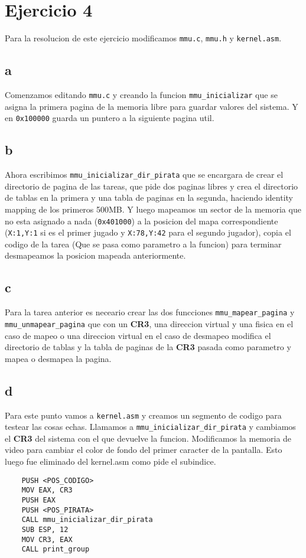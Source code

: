 \section{Ejercicio 4}

Para la resolucion de este ejercicio modificamos \texttt{mmu.c}, \texttt{mmu.h} y \texttt{kernel.asm}.

\subsection{a}
Comenzamos editando \texttt{mmu.c} y creando la funcion \texttt{mmu\_inicializar} que se asigna la primera pagina de la memoria libre para guardar valores del sistema. Y en \texttt{0x100000} guarda un puntero a la siguiente pagina util.

\subsection{b}
Ahora escribimos \texttt{mmu\_inicializar\_dir\_pirata} que se encargara de crear el directorio de pagina de las tareas, que pide dos paginas libres y crea el directorio de tablas en la primera y una tabla de paginas en la segunda, haciendo identity mapping de los primeros 500MB. Y luego mapeamos un sector de la memoria que no esta asignado a nada (\texttt{0x401000}) a la posicion del mapa correspondiente (\texttt{X:1,Y:1} si es el primer jugado y \texttt{X:78,Y:42} para el segundo jugador), copia el codigo de la tarea (Que se pasa como parametro a la funcion) para terminar desmapeamos la posicion mapeada anteriormente.

\subsection{c}
Para la tarea anterior es neceario crear las dos funcciones \texttt{mmu\_mapear\_pagina} y \texttt{mmu\_unmapear\_pagina} que con un \textbf{CR3}, una direccion virtual y una fisica en el caso de mapeo o una direccion virtual en el caso de desmapeo modifica el directorio de tablas y la tabla de paginas de la \textbf{CR3} pasada como parametro y mapea o desmapea la pagina.

\subsection{d}
Para este punto vamos a \texttt{kernel.asm} y creamos un segmento de codigo para testear las cosas echas. Llamamos a \texttt{mmu\_inicializar\_dir\_pirata} y cambiamos el \textbf{CR3} del sistema con el que devuelve la funcion. Modificamos la memoria de video para cambiar el color de fondo del primer caracter de la pantalla. Esto luego fue eliminado del kernel.asm como pide el subindice.\\

\begin{lstlisting}
	PUSH <POS_CODIGO>
    MOV EAX, CR3
    PUSH EAX
    PUSH <POS_PIRATA>
    CALL mmu_inicializar_dir_pirata
    SUB ESP, 12
    MOV CR3, EAX
    CALL print_group
\end{lstlisting}